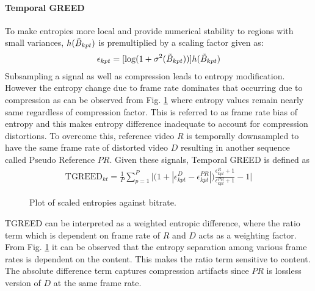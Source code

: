 \documentclass[conference]{IEEEtran}
\begin{document}
\paragraph*{\textbf{Temporal GREED}}
To make entropies more local and provide numerical stability to regions with small variances, $h(\Tilde{B}_{kpt})$ is premultiplied by a scaling factor given as:
\begin{align*}
    \epsilon_{kpt} = [\log(1+\sigma^2(\Tilde{B}_{kpt}))]h(\Tilde{B}_{kpt})
\end{align*}
Subsampling a signal as well as compression leads to entropy modification. However the entropy change due to frame rate dominates that occurring due to compression as can be observed from Fig. \ref{fig:frame_rate_bias} where entropy values remain nearly same regardless of compression factor. This is referred to as frame rate bias of entropy and this makes entropy difference inadequate to account for compression distortions. To overcome this, reference video $R$ is temporally downsampled to have the same frame rate of distorted video $D$ resulting in another sequence called Pseudo Reference $PR$. Given these signals, Temporal GREED is defined as
\begin{align}
\text{TGREED}_{kt} = \frac{1}{P}\sum_{p=1} ^P \Bigg|\Big(1 + |\epsilon_{kpt} ^D - \epsilon_{kpt} ^{PR}|\Big) \frac{\epsilon_{kpt} ^R + 1}{\epsilon_{kpt} ^{PR} + 1} - 1 \Bigg|
    \label{eqn:GTI}
\end{align}

\begin{figure}[t]
    \captionsetup[subfigure]{justification=centering}
        \centering
         \quad
        \caption{Plot of scaled entropies against bitrate.}
        \label{fig:frame_rate_bias}
\end{figure}
TGREED can be interpreted as a weighted entropic difference, where the ratio term which is dependent on frame rate of $R$ and $D$ acts as a weighting factor. From Fig. \ref{fig:frame_rate_bias} it can be observed that the entropy separation among various frame rates is dependent on the content. This makes the ratio term sensitive to content. The absolute difference term captures compression artifacts since $PR$ is lossless version of $D$ at the same frame rate.
\end{document}
